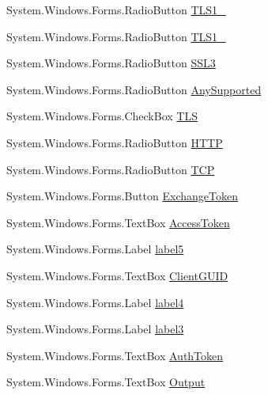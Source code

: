 \begin{DoxyCompactItemize}
\item 
System.\+Windows.\+Forms.\+Radio\+Button \mbox{\hyperlink{class_form_sim_1_1_form1_ad846aa3e6cfb67966ff72e360ad5896d}{T\+L\+S1\+\_}}
\item 
System.\+Windows.\+Forms.\+Radio\+Button \mbox{\hyperlink{class_form_sim_1_1_form1_aa6bea49227d76f110c15b8ca5b58bc6b}{T\+L\+S1\+\_}}
\item 
System.\+Windows.\+Forms.\+Radio\+Button \mbox{\hyperlink{class_form_sim_1_1_form1_a909569fd407fe0ddce10b6dc34a26f1e}{S\+S\+L3}}
\item 
System.\+Windows.\+Forms.\+Radio\+Button \mbox{\hyperlink{class_form_sim_1_1_form1_ad73a0aa5c4cfc71f0bba70eec1edfb92}{Any\+Supported}}
\item 
System.\+Windows.\+Forms.\+Check\+Box \mbox{\hyperlink{class_form_sim_1_1_form1_a3760928ef463d00f184c67c5b30355e9}{T\+LS}}
\item 
System.\+Windows.\+Forms.\+Radio\+Button \mbox{\hyperlink{class_form_sim_1_1_form1_a92e6dec54dfb1acfbb7a8f63f8489e43}{H\+T\+TP}}
\item 
System.\+Windows.\+Forms.\+Radio\+Button \mbox{\hyperlink{class_form_sim_1_1_form1_ad9d0a83e0e5b553c33946f7d08f61607}{T\+CP}}
\item 
System.\+Windows.\+Forms.\+Button \mbox{\hyperlink{class_form_sim_1_1_form1_a20db0b50c8258c0e32a51be1f70b706e}{Exchange\+Token}}
\item 
System.\+Windows.\+Forms.\+Text\+Box \mbox{\hyperlink{class_form_sim_1_1_form1_abdee1962ad29b235756c9217ae497b47}{Access\+Token}}
\item 
System.\+Windows.\+Forms.\+Label \mbox{\hyperlink{class_form_sim_1_1_form1_a9f8c85dcf7680bdc2cc5739e29d539ee}{label5}}
\item 
System.\+Windows.\+Forms.\+Text\+Box \mbox{\hyperlink{class_form_sim_1_1_form1_a9159fb7a54ec1f9912f5230f7cd21053}{Client\+G\+U\+ID}}
\item 
System.\+Windows.\+Forms.\+Label \mbox{\hyperlink{class_form_sim_1_1_form1_a3f3c4fcc79b7eeeee73a25153dbabb00}{label4}}
\item 
System.\+Windows.\+Forms.\+Label \mbox{\hyperlink{class_form_sim_1_1_form1_ae15fea51b38df18919dc31166bb31476}{label3}}
\item 
System.\+Windows.\+Forms.\+Text\+Box \mbox{\hyperlink{class_form_sim_1_1_form1_a9ded5796e52e8e26de24e566dd3aa7e2}{Auth\+Token}}
\item 
System.\+Windows.\+Forms.\+Text\+Box \mbox{\hyperlink{class_form_sim_1_1_form1_a4ef9ca660be8039828c8b8cb778770d4}{Output}}

\end{DoxyCompactItemize}
